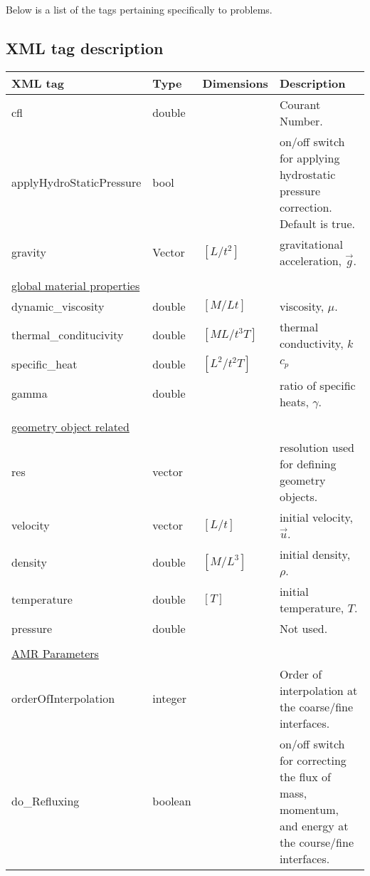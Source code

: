 \newpage
Below is a list of the  tags pertaining specifically to  problems.

\subsection{XML tag description}
\begin {center}
\scriptsize
\begin{tabular}{lllp{8cm}}
XML tag & Type & Dimensions & Description\\
\hline
\hline
cfl                   & double &               &    Courant Number.\\
applyHydroStaticPressure & bool &              &    on/off switch for applying hydrostatic pressure correction.  Default is true.\\
gravity               & Vector & $[L/t^2]$     &    gravitational acceleration, $\vec{g}$.\\
\\
\underline{\footnotesize{global material properties}} & & &\\
dynamic\_viscosity    & double & $[M/Lt]$      &    viscosity, $\mu$.\\
thermal\_conditucivity& double & $[ML/t^3T]$   &    thermal conductivity, $k$\\
specific\_heat        & double & $[L^2/t^2 T]$ &   $c_p$\\
gamma                 & double &               &    ratio of specific heats, $\gamma$.\\
\\
\underline{\footnotesize{geometry object related}} & & &\\
res                   & vector &               &    resolution used for defining geometry objects.\\
velocity              & vector & $[L/t]$       &    initial velocity, $\vec{u}$.\\
density               & double & $[M/L^3]$     &    initial density, $\rho$.\\
temperature           & double & $[T]$         &    initial temperature, $T$.\\
pressure              & double &               &    Not used. \\
\\
\underline{\footnotesize{AMR Parameters}} & & & \\
orderOfInterpolation  & integer &              &    Order of interpolation at the coarse/fine interfaces. \\
do\_Refluxing         & boolean &              &    on/off switch for correcting the flux of mass, momentum, and energy at the
                                                    course/fine interfaces.\\
\hline
\end{tabular}
\end{center}

